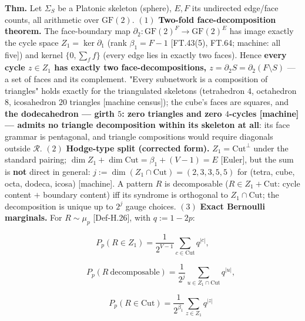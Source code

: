 \begin{theorem}\label{tag:FT-72}
\textbf{Thm.} Let $\Sigma_S$ be a Platonic skeleton (sphere), $E,F$ its undirected edge/face counts, all arithmetic over $\mathrm{GF}(2)$. $(1)$ \textbf{Two-fold face-decomposition theorem.} The face-boundary map $\partial_2:\mathrm{GF}(2)^F\to\mathrm{GF}(2)^E$ has image exactly the cycle space $Z_1=\ker\partial_1$ (rank $\beta_1=F-1$ [FT.43(5), FT.64; machine: all five]) and kernel $\{0,\sum_f f\}$ (every edge lies in exactly two faces). Hence \textbf{every cycle $z\in Z_1$ has exactly two face-decompositions, $z=\partial_2 S=\partial_2(F\setminus S)$} — a set of faces and its complement. "Every subnetwork is a composition of triangles" holds exactly for the triangulated skeletons (tetrahedron $4$, octahedron $8$, icosahedron $20$ triangles [machine census]); the cube's faces are squares, and \textbf{the dodecahedron — girth $5$: zero triangles and zero $4$-cycles [machine] — admits no triangle decomposition within its skeleton at all}: its face grammar is pentagonal, and triangle compositions would require diagonals outside $\mathcal R$. $(2)$ \textbf{Hodge-type split (corrected form).} $Z_1=\mathrm{Cut}^\perp$ under the standard pairing; $\dim Z_1+\dim\mathrm{Cut}=\beta_1+(V{-}1)=E$ [Euler], but the sum is \textbf{not} direct in general: $j:=\dim(Z_1\cap\mathrm{Cut})=(2,3,3,5,5)$ for (tetra, cube, octa, dodeca, icosa) [machine]. A pattern $R$ is decomposable ($R\in Z_1+\mathrm{Cut}$: cycle content $+$ boundary content) iff its syndrome is orthogonal to $Z_1\cap\mathrm{Cut}$; the decomposition is unique up to $2^j$ gauge choices. $(3)$ \textbf{Exact Bernoulli marginals.} For $R\sim\mu_p$ [Def-H.26], with $q:=1-2p$:

\[
P_p(R\in Z_1)=\frac{1}{2^{V-1}}\sum_{c\in\mathrm{Cut}}q^{|c|},
\]

\[
\qquad P_p(R\ \text{decomposable})=\frac{1}{2^{j}}\sum_{u\in Z_1\cap\mathrm{Cut}}q^{|u|},
\]

\[
\qquad P_p(R\in\mathrm{Cut})=\frac{1}{2^{\beta_1}}\sum_{z\in Z_1}q^{|z|}
\]


\end{theorem}
